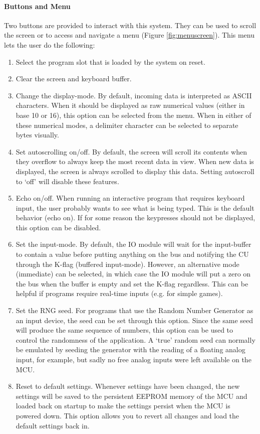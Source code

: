 \paragraph{Buttons and Menu} Two buttons are provided to interact with this system. They can be used to scroll the screen or to access and navigate a menu (Figure \ref{fig:menuscreen}). This menu lets the user do the following:
\begin{enumerate}
\item Select the program slot that is loaded by the system on reset.
\item Clear the screen and keyboard buffer.
\item Change the display-mode. By default, incoming data is interpreted as ASCII characters. When it should be displayed as raw numerical values (either in base 10 or 16), this option can be selected from the menu. When in either of these numerical modes, a delimiter character can be selected to separate bytes visually.
\item Set autoscrolling on/off. By default, the screen will scroll its contents when they overflow to always keep the most recent data in view. When new data is displayed, the screen is always scrolled to display this data. Setting autoscroll to `off' will disable these features.
\item Echo on/off. When running an interactive program that requires keyboard input, the user probably wants to see what is being typed. This is the default behavior (echo on). If for some reason the keypresses should not be displayed, this option can be disabled.
\item Set the input-mode. By default, the IO module will wait for the input-buffer to contain a value before putting anything on the bus and notifying the CU through the K-flag (buffered input-mode). However, an alternative mode (immediate) can be selected, in which case the IO module will put a zero on the bus when the buffer is empty and set the K-flag regardless. This can be helpful if programs require real-time inputs (e.g. for simple games).
\item Set the RNG seed. For programs that use the Random Number Generator as an input device, the seed can be set through this option. Since the same seed will produce the same sequence of numbers, this option can be used to control the randomness of the application. A `true' random seed can normally be emulated by seeding the generator with the reading of a floating analog input, for example, but sadly no free analog inputs were left available on the MCU.
\item Reset to default settings. Whenever settings have been changed, the new settings will be saved to the persistent EEPROM memory of the MCU and loaded back on startup to make the settings persist when the MCU is powered down. This option allows you to revert all changes and load the default settings back in.
\end{enumerate}

